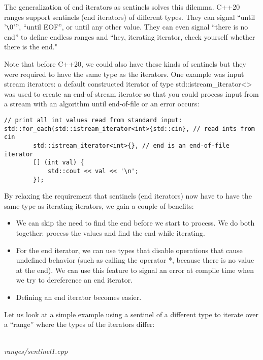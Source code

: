 The generalization of end iterators as sentinels solves this dilemma. C++20 ranges support sentinels (end iterators) of different types. They can signal “until ’\verb|\|0’”, “until EOF”, or until any other value. They can even signal “there is no end” to define endless ranges and “hey, iterating iterator, check yourself whether there is the end."

Note that before C++20, we could also have these kinds of sentinels but they were required to have the same type as the iterators. One example was input stream iterators: a default constructed iterator of type std::istream\_iterator<> was used to create an end-of-stream iterator so that you could process input from a stream with an algorithm until end-of-file or an error occurs:

\begin{lstlisting}[style=styleCXX]
// print all int values read from standard input:
std::for_each(std::istream_iterator<int>{std::cin}, // read ints from cin
		std::istream_iterator<int>{}, // end is an end-of-file iterator
		[] (int val) {
			std::cout << val << '\n';
		});
\end{lstlisting}

By relaxing the requirement that sentinels (end iterators) now have to have the same type as iterating iterators, we gain a couple of benefits:

\begin{itemize}
\item
We can skip the need to find the end before we start to process. We do both together: process the values and find the end while iterating.

\item
For the end iterator, we can use types that disable operations that cause undefined behavior (such as calling the operator *, because there is no value at the end). We can use this feature to signal an error at compile time when we try to dereference an end iterator.

\item
Defining an end iterator becomes easier.
\end{itemize}

Let us look at a simple example using a sentinel of a different type to iterate over a “range” where the types of the iterators differ:

\noindent
\hspace*{\fill} \\ %
\textit{ranges/sentinel1.cpp}

